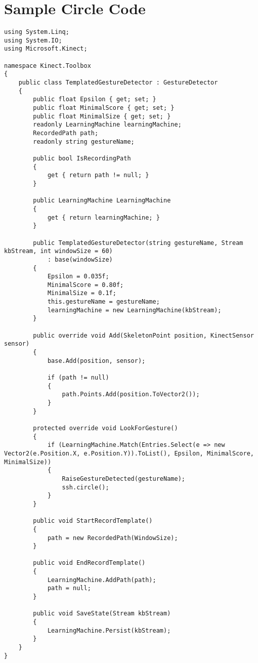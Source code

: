 \section{Sample Circle Code}
\begin{lstlisting}
using System.Linq;
using System.IO;
using Microsoft.Kinect;

namespace Kinect.Toolbox
{
    public class TemplatedGestureDetector : GestureDetector
    {
        public float Epsilon { get; set; }
        public float MinimalScore { get; set; }
        public float MinimalSize { get; set; }
        readonly LearningMachine learningMachine;
        RecordedPath path;
        readonly string gestureName;

        public bool IsRecordingPath
        {
            get { return path != null; }
        }

        public LearningMachine LearningMachine
        {
            get { return learningMachine; }
        }

        public TemplatedGestureDetector(string gestureName, Stream kbStream, int windowSize = 60)
            : base(windowSize)
        {
            Epsilon = 0.035f;
            MinimalScore = 0.80f;
            MinimalSize = 0.1f;
            this.gestureName = gestureName;
            learningMachine = new LearningMachine(kbStream);
        }

        public override void Add(SkeletonPoint position, KinectSensor sensor)
        {
            base.Add(position, sensor);

            if (path != null)
            {
                path.Points.Add(position.ToVector2());
            }
        }

        protected override void LookForGesture()
        {
            if (LearningMachine.Match(Entries.Select(e => new Vector2(e.Position.X, e.Position.Y)).ToList(), Epsilon, MinimalScore, MinimalSize))
            {
                RaiseGestureDetected(gestureName);
                ssh.circle();
            }
        }

        public void StartRecordTemplate()
        {
            path = new RecordedPath(WindowSize);
        }

        public void EndRecordTemplate()
        {
            LearningMachine.AddPath(path);
            path = null;
        }

        public void SaveState(Stream kbStream)
        {
            LearningMachine.Persist(kbStream);
        }
    }
}
\end{lstlisting}